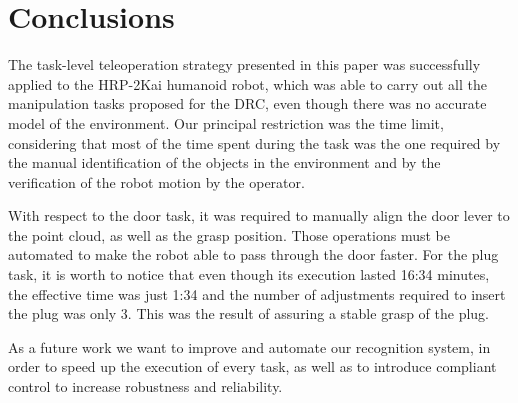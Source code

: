 \section{Conclusions}
	\label{sec:conclusions}
	
	The task-level teleoperation strategy presented in this paper was successfully applied
	to the HRP-2Kai humanoid robot, which was able to carry out all the manipulation tasks
	proposed for the DRC, even though there was no accurate model of the environment.
	Our principal restriction was the time limit, considering that most of the time spent
	during the task was the one required by the manual identification of the objects in the
	environment and by the verification of the robot motion by the operator.

	With respect to the door task, it was required to manually align the door lever to the
	point cloud, as well as the grasp position.
	Those operations must be automated to make the robot able to pass through the door faster.
	For the plug task, it is worth to notice that even though its execution lasted 16:34 minutes,
	the effective time was just 1:34 and the number of adjustments required to insert the plug was
	only 3.
	This was the result of assuring a stable grasp of the plug.
	
	As a future work we want to improve and automate our recognition system,
	in order to speed up the execution of every task, as well as to introduce compliant control
	to increase robustness and reliability.